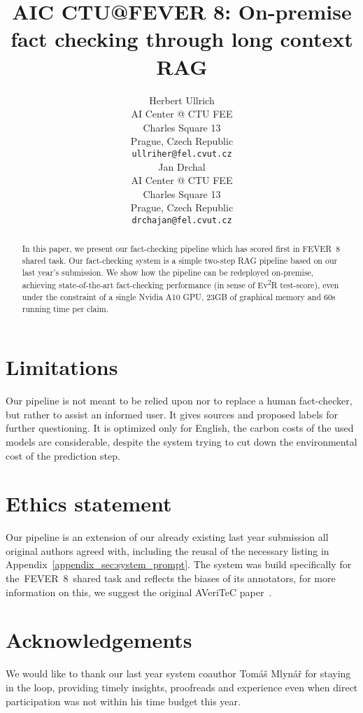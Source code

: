 \documentclass[11pt]{article}
\title{AIC CTU@FEVER 8: On-premise fact checking through long context RAG}
\author{Herbert Ullrich \\
AI Center @ CTU FEE\\
Charles Square 13\\
Prague, Czech Republic\\
\texttt{ullriher@fel.cvut.cz} \\\And
Jan Drchal \\
AI Center @ CTU FEE\\
Charles Square 13\\
Prague, Czech Republic\\
\texttt{drchajan@fel.cvut.cz} \\}
\newcommand{\averitec}{FEVER~8}
\newcommand{\evr}{Ev\textsuperscript{2}R}
\begin{document}
{\makeatletter\acl@finalcopytrue
  \maketitle
}
\begin{abstract}
In this paper, we present our fact-checking pipeline which has scored first in \averitec{} shared task. Our fact-checking system is a simple two-step RAG pipeline based on our last year's submission. We show how the pipeline can be redeployed on-premise, achieving state-of-the-art fact-checking performance (in sense of \evr{} test-score), even under the constraint of a single Nvidia A10 GPU, 23GB of graphical memory and 60s running time per claim.

\end{abstract}



%

%



\section*{Limitations}
Our pipeline is not meant to be relied upon nor to replace a human fact-checker, but rather to assist an informed user. It gives sources and proposed labels for further questioning. It is optimized only for English, the carbon costs of the used models are considerable, despite the system trying to cut down the environmental cost of the prediction step.

\section*{Ethics statement}
Our pipeline is an extension of our already existing last year submission all original authors agreed with, including the reusal of the necessary listing in Appendix~\ref{appendix_sec:system_prompt}.
The system was build specifically for the~\averitec~shared task and reflects the biases of its annotators, for more information on this, we suggest the original AVeriTeC paper~\cite{averitec2024}.
\section*{Acknowledgements}
We would like to thank our last year system coauthor Tomáš Mlynář for staying in the loop, providing timely insights, proofreads and experience even when direct participation was not within his time budget this year.
\end{document}
